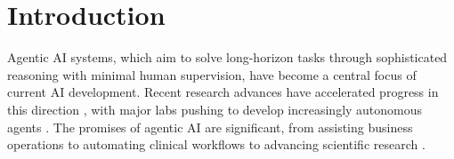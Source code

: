 \documentclass{article}
\theoremstyle{plain}
\theoremstyle{definition}
\theoremstyle{remark}
\begin{document}




\section{Introduction}
\label{sec:intro}


Agentic AI systems, which aim to solve long-horizon tasks through sophisticated reasoning with minimal human supervision, have become a central focus of current AI development. Recent research advances have accelerated progress in this direction \cite{li2024survey,acharya2025agentic}, with major labs pushing to develop increasingly autonomous agents \cite{anthropic_computer_2024,anthropic_claude_code_2025,openai2025operator,deepmind2025mariner}. The promises of agentic AI are significant, from assisting business operations \cite{chawla2024agentic} to automating clinical workflows \cite{qiu2024llm} to advancing scientific research \cite{lu2024ai}. 
\end{document}
